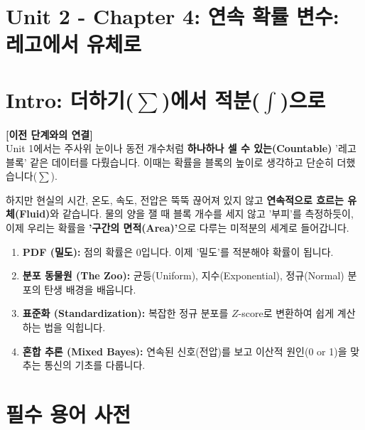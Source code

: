 \documentclass[11pt,a4paper]{book}
\newcommand{\chaptertitle}[2]{\section*{#1: #2}}
\theoremstyle{definition}
\begin{document}
\chaptertitle{Unit 2 - Chapter 4}{연속 확률 변수: 레고에서 유체로}

\section*{Intro: 더하기($\sum$)에서 적분($\int$)으로}

\textbf{[이전 단계와의 연결]} \\
Unit 1에서는 주사위 눈이나 동전 개수처럼 \textbf{하나하나 셀 수 있는(Countable)} '레고 블록' 같은 데이터를 다뤘습니다. 이때는 확률을 블록의 높이로 생각하고 단순히 더했습니다($\sum$).

하지만 현실의 시간, 온도, 속도, 전압은 뚝뚝 끊어져 있지 않고 \textbf{연속적으로 흐르는 유체(Fluid)}와 같습니다. 물의 양을 잴 때 블록 개수를 세지 않고 '부피'를 측정하듯이, 이제 우리는 확률을 \textbf{'구간의 면적(Area)'}으로 다루는 미적분의 세계로 들어갑니다.

\begin{tcolorbox}[colback=subgray, title={\textbf{📌 이 단원의 핵심 개요 (Overview)}}]
\begin{enumerate}
    \item \textbf{PDF (밀도):} 점의 확률은 0입니다. 이제 '밀도'를 적분해야 확률이 됩니다.
    \item \textbf{분포 동물원 (The Zoo):} 균등(Uniform), 지수(Exponential), 정규(Normal) 분포의 탄생 배경을 배웁니다.
    \item \textbf{표준화 (Standardization):} 복잡한 정규 분포를 $Z$-score로 변환하여 쉽게 계산하는 법을 익힙니다.
    \item \textbf{혼합 추론 (Mixed Bayes):} 연속된 신호(전압)를 보고 이산적 원인(0 or 1)을 맞추는 통신의 기초를 다룹니다.
\end{enumerate}
\end{tcolorbox}

\section{필수 용어 사전}
\end{document}

